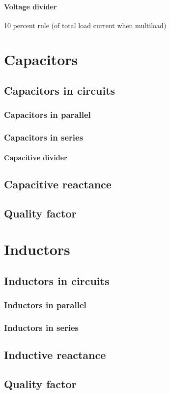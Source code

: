 \documentclass{report}
\begin{document}
\paragraph{Voltage divider}
10 percent rule (of total load current when multiload)
\section{Capacitors}
\subsection{Capacitors in circuits}
\subsubsection{Capacitors in parallel}
\subsubsection{Capacitors in series}
\paragraph{Capacitive divider}
\subsection{Capacitive reactance}
\subsection{Quality factor}
\section{Inductors}
\subsection{Inductors in circuits}
\subsubsection{Inductors in parallel}
\subsubsection{Inductors in series}
\subsection{Inductive reactance}
\subsection{Quality factor}
\end{document}
